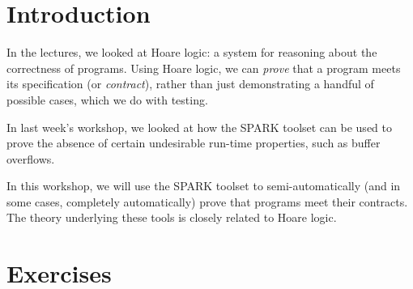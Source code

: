 \documentclass{article}
\begin{document}
\lstset{language=Ada,aboveskip=3mm}


\section*{Introduction}

In the lectures, we looked at Hoare logic: a system for reasoning about the correctness of programs. Using Hoare logic, we can {\em prove} that a program meets its specification (or {\em contract}), rather than just demonstrating a handful of possible cases, which we do with testing.

In last week's workshop, we looked at how the SPARK toolset can be used to prove the absence of certain undesirable run-time properties, such as buffer overflows. 

In this workshop, we will use the SPARK toolset to semi-automatically (and in some cases, completely automatically) prove that programs meet their contracts. The theory underlying these tools is closely related to Hoare logic.

\section*{Exercises}
\end{document}
